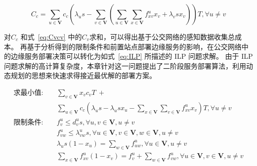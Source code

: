 \begin{equation}
\label{eq:c_m}
C_c = \sum_{u\in \boldsymbol{V}}c_c(\lambda_u s - \sum_{v\in \boldsymbol{V}}(\sum_{u\in \boldsymbol{V}}\sum_{x\in \boldsymbol{V}}f^u_{xv} x_v + \lambda_v s x_v))T, \forall u \neq v
\end{equation}

对$C_c$ 和式~\eqref{eq:Cvcv} 中的$C_v$求和，可以得出基于公交网络的感知数据收集总成本。
再基于分析得到的限制条件和前置站点部署边缘服务的影响，在公交网络中的边缘服务部署决策可以转化为如式~\eqref{eq:ILP} 所描述的 ILP 问题求解。
由于 ILP 问题求解的高计算复杂度，本章针对这一问题提出了二阶段服务部署算法，利用动态规划的思想来快速求得接近最优解的部署方案。



\begin{equation}
\begin{aligned}
求最小值: &\quad \sum_{v\in \boldsymbol{V}}x_v c_vT \ + \\&\quad \sum_{u\in \boldsymbol{V}}c_c(\lambda_u s -  \lambda_u s x_u - \sum_{x\in \boldsymbol{V}}\sum_{v\in \boldsymbol{V}}f^u_{xv} x_v )T, \forall u \neq v\\
\text{限制条件:} &\quad  f^u_v \leq d^u_v s, \forall u, v\in \boldsymbol{V}, u\neq v\\
&\quad f^u_{vw} \leq \lambda^u_{vw} s, \forall u \in \boldsymbol{V}, v \in \boldsymbol{V}, w \in \boldsymbol{V}, u \neq v\\
&\quad \lambda_u s (1 - x_u) = \sum_{w\in \boldsymbol{V}}f^u_{uw}, \forall u\in \boldsymbol{V}, u \neq v\\
&\quad \sum_{x\in \boldsymbol{V}}f^u_{xv} (1-x_v) = f^u_v + \sum_{w\in \boldsymbol{V}}f^u_{vw}, \forall u\in \boldsymbol{V}, v\in \boldsymbol{V},u \neq v
\end{aligned}
\label{eq:ILP}
\end{equation}

